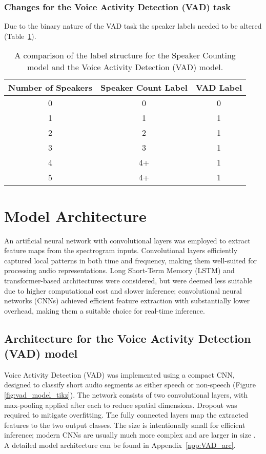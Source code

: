 \subsubsection{Changes for the Voice Activity Detection (VAD) task}
\label{sec:vad_labels}
Due to the binary nature of the VAD task the speaker labels needed to be altered (Table~\ref{tab:VAD_data_change}).

\begin{table}
\label{tab:VAD_data_change}
\centering
\caption{A comparison of the label structure for the Speaker Counting model and the Voice Activity Detection (VAD) model.}
\begin{tabular}{|c|c|c|}
\hline
\textbf{Number of Speakers} & \textbf{Speaker Count Label} & \textbf{VAD Label} \\
\hline
0 & 0 & 0\\
\hline
1 & 1 & 1\\
\hline
2 & 2 & 1 \\
\hline
3 & 3 & 1 \\
\hline
4 & 4+ & 1 \\
\hline
5 & 4+ & 1 \\
\hline
\end{tabular}
\end{table}


\section{Model Architecture}
An artificial neural network with convolutional layers was employed to extract feature maps from the spectrogram inputs. Convolutional layers efficiently captured local patterns in both time and frequency, making them well-suited for processing audio representations. Long Short-Term Memory (LSTM) and transformer-based architectures were considered, but were deemed less suitable due to higher computational cost and slower inference; convolutional neural networks (CNNs) achieved efficient feature extraction with substantially lower overhead, making them a suitable choice for real-time inference.

\subsection{Architecture for the Voice Activity Detection (VAD) model}
Voice Activity Detection (VAD) was implemented using a compact CNN, designed to classify short audio segments as either speech or non-speech (Figure \ref{fig:vad_model_tikz}). The network consists of two convolutional layers, with max-pooling applied after each to reduce spatial dimensions. Dropout was required to mitigate overfitting. The fully connected layers map the extracted features to the two output classes. The size is intentionally small for efficient inference; modern CNNs are usually much more complex and are larger in size \cite{modelsizes}. A detailed model architecture can be found in Appendix~\ref{app:VAD_arc}.

